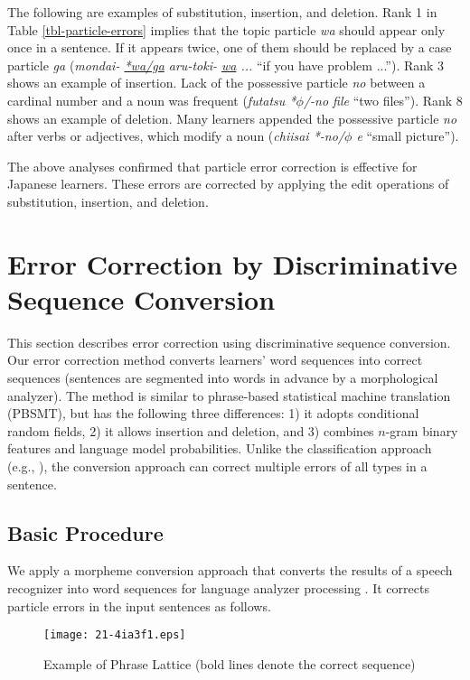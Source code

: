 \documentclass[english]{jnlp_1.4_rep}
\begin{document}
The following are examples of substitution, insertion, and
deletion. Rank 1 in Table \ref{tbl-particle-errors} implies that the
topic particle \textit{wa} should appear only once in a sentence. If
it appears twice, one of them should be replaced by a case particle
\textit{ga} ({\it mondai- \underline{*wa/ga} aru-toki- \underline{wa}
...} ``if you have problem ...''). Rank 3 shows an example of
insertion. Lack of the possessive particle \textit{no} between a
cardinal number and a noun was frequent ({\it futatsu *$\phi$/-no
file} ``two files''). Rank 8 shows an example of deletion. Many
learners appended the possessive particle \textit{no} after verbs or
adjectives, which modify a noun ({\it chiisai *-no/$\phi$ e} ``small
picture'').


The above analyses confirmed that particle error correction is
effective for Japanese learners. These errors are corrected by
applying the edit operations of substitution, insertion, and deletion.



\section{Error Correction by Discriminative Sequence Conversion}
\label{sec-conversion}

This section describes error correction using discriminative sequence
conversion. Our error correction method converts learners' word
sequences into correct sequences (sentences are segmented into words
in advance by a morphological analyzer). The method is similar to
phrase-based statistical machine translation (PBSMT), but has the
following three differences: 1) it adopts conditional random fields,
2) it allows insertion and deletion, and 3) combines $n$-gram binary
features and language model probabilities. Unlike the classification
approach (e.g., ), the
conversion approach can correct multiple errors of all types in a
sentence.


\subsection{Basic Procedure}

We apply a morpheme conversion approach that converts the results of a
speech recognizer into word sequences for language analyzer processing
. It corrects particle errors in the
input sentences as follows.

\begin{figure}[b]
\begin{center}
\texttt{[image: 21-4ia3f1.eps]}
\end{center}
\caption{Example of Phrase Lattice (bold lines denote the correct sequence)}
\label{fig-lattice}
\end{figure}
\end{document}
